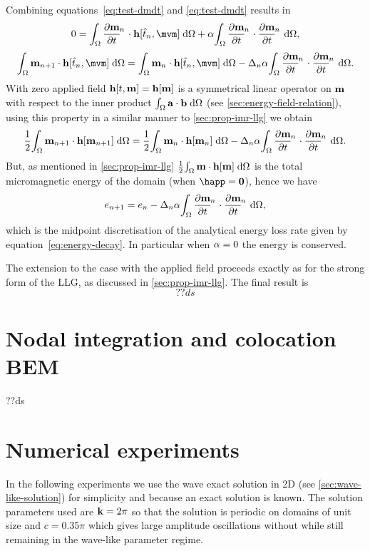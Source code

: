 Combining equations~\eqref{eq:test-dmdt} and \eqref{eq:test-dmdt} results in
\begin{equation}
  0 = \intd{\dmdtm \cdot \hv[\tm, \mvm]} + \dampc \intd{\dmdtm \cdot \dmdtm},
\end{equation}
\ie
\begin{equation}
  \intd{\mv_{n+1} \cdot \hv[\tm, \mvm]} = \intd{\mv_n \cdot \hv[\tm, \mvm]} - \dtn \dampc \intd{\dmdtm \cdot \dmdtm}.
\end{equation}
With zero applied field $\mathbf{h}[t, \mathbf{m}] = \mathbf{h}[\mathbf{m}]$ is a symmetrical linear operator on $\mathbf{m}$ with respect to the inner product ${\int_{\Omega} {\mathbf{a}} \cdot {\mathbf{b}} {\; \text{d}} {\Omega}}$ (see \autoref{sec:energy-field-relation}), using this property in a similar manner to \autoref{sec:prop-imr-llg} we obtain
\begin{equation}
  \frac{1}{2}\intd{\mv_{n+1} \cdot \hv[\mv_{n+1}]} = \frac{1}{2}\intd{\mv_n \cdot \hv[\mv_n]} - \dtn \dampc \intd{\dmdtm \cdot \dmdtm}.
\end{equation}
But, as mentioned in \autoref{sec:prop-imr-llg} $\frac{1}{2}{\int_{\Omega} \mathbf{m} \cdot \mathbf{h}[\mathbf{m}] {\; \text{d}} {\Omega}}$ is the total micromagnetic energy of the domain (when $\happ = \zerov$), hence we have
\begin{equation}
  \e_{n+1} = \e_n - \dtn \dampc \intd{\dmdtm \cdot \dmdtm},
\end{equation}
which is the midpoint discretisation of the analytical energy loss rate given by equation~\eqref{eq:energy-decay}.
In particular when $\alpha = 0$ the energy is conserved.

The extension to the case with the applied field proceeds exactly as for the strong form of the LLG, as discussed in \autoref{sec:prop-imr-llg}.
The final result is
\begin{equation}
  ??ds
\end{equation}

\section{Nodal integration and colocation BEM}

??ds



\section{Numerical experiments}
\label{sec:numer-exper}

In the following experiments we use the wave exact solution in 2D (see \autoref{sec:wave-like-solution}) for simplicity and because an exact solution is known.
The solution parameters used are $\mathbf{k} = 2\pi$ so that the solution is periodic on domains of unit size and $c = 0.35\pi$ which gives large amplitude oscillations without while still remaining in the wave-like parameter regime.

